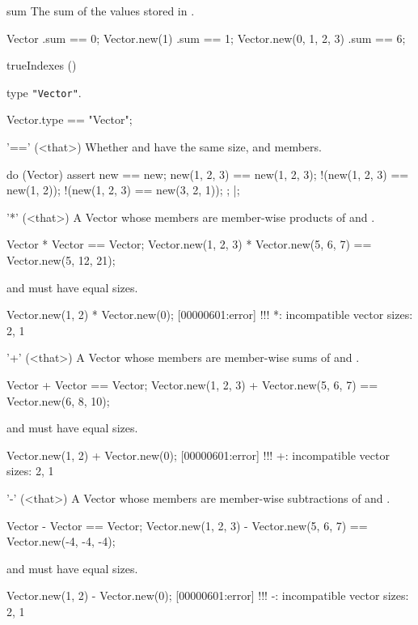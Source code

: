 \begin{urbiscriptapi}
\item[sum]%
  The sum of the values stored in \this.
\begin{urbiassert}
Vector                  .sum == 0;
Vector.new(1)           .sum == 1;
Vector.new(0, 1, 2, 3)  .sum == 6;
\end{urbiassert}

\item[trueIndexes]()%

\item[type]%
  \lstinline|"Vector"|.
\begin{urbiassert}
Vector.type == "Vector";
\end{urbiassert}

\item['=='](<that>)%
  Whether \this and \that have the same size, and members.
\begin{urbiscript}
do (Vector)
{
  assert
  {
               new == new;
      new(1, 2, 3) == new(1, 2, 3);
    !(new(1, 2, 3) == new(1, 2));
    !(new(1, 2, 3) == new(3, 2, 1));
  };
}|;
\end{urbiscript}

\item['*'](<that>)%
  A Vector whose members are member-wise products of \this and \that.
\begin{urbiassert}
Vector              * Vector              == Vector;
Vector.new(1, 2, 3) * Vector.new(5, 6, 7) == Vector.new(5, 12, 21);
\end{urbiassert}
  \this and \that must have equal sizes.
\begin{urbiscript}
Vector.new(1, 2) * Vector.new(0);
[00000601:error] !!! *: incompatible vector sizes: 2, 1
\end{urbiscript}

\item['+'](<that>)%
  A Vector whose members are member-wise sums of \this and \that.
\begin{urbiassert}
Vector              + Vector              == Vector;
Vector.new(1, 2, 3) + Vector.new(5, 6, 7) == Vector.new(6, 8, 10);
\end{urbiassert}
  \this and \that must have equal sizes.
\begin{urbiscript}
Vector.new(1, 2) + Vector.new(0);
[00000601:error] !!! +: incompatible vector sizes: 2, 1
\end{urbiscript}

\item['-'](<that>)%
  A Vector whose members are member-wise subtractions of \this and \that.
\begin{urbiassert}
Vector              - Vector              == Vector;
Vector.new(1, 2, 3) - Vector.new(5, 6, 7) == Vector.new(-4, -4, -4);
\end{urbiassert}
  \this and \that must have equal sizes.
\begin{urbiscript}
Vector.new(1, 2) - Vector.new(0);
[00000601:error] !!! -: incompatible vector sizes: 2, 1
\end{urbiscript}


\end{urbiscriptapi}
